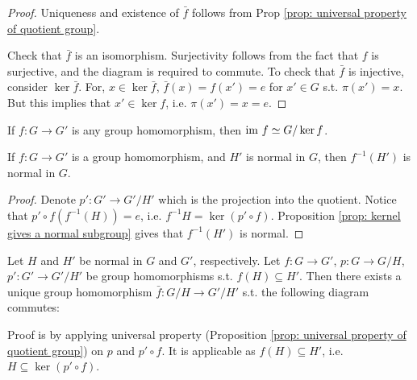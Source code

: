 \documentclass{article}
\begin{document}
\begin{proof}
    Uniqueness and existence of $\bar{f}$ follows from Prop \ref{prop: universal property of quotient group}. 

    Check that $\bar{f}$ is an isomorphism. Surjectivity follows from the fact that $f$ is surjective, and the diagram is required to commute. To check that $\bar{f}$ is injective, consider $\ker \bar{f}$. For, $x \in \ker \bar{f}$, $\bar{f}(x) = f(x') = e$ for $x' \in G$ s.t. $\pi(x') = x$. But this implies that $x' \in \ker f$, i.e. $\pi(x') = x = e$.
\end{proof}

\begin{corollary}
    If $f: G \to G'$ is any group homomorphism, then $\mathrm{im}\  f \simeq G/\ker f$.
\end{corollary}

\begin{remark}
    If $f: G \to G'$ is a group homomorphism, and $H'$ is normal in $G$, then $f^{-1}(H')$ is normal in $G$.
\end{remark}

\begin{proof}
    Denote $p': G' \to G'/H'$ which is the projection into the quotient. Notice that $p' \circ f (f^{-1}(H)) = e$, i.e. $f^{-1}H = \ker (p' \circ f)$. Proposition \ref{prop: kernel gives a normal subgroup} gives that $f^{-1}(H')$ is normal. 
\end{proof}

\begin{remark}\label{rmk: transformation between quotient on normal subgroups}
    Let $H$ and $H'$ be normal in $G$ and $G'$, respectively. Let $f: G \to G'$, $p: G \to G/H$, $p': G' \to G'/H'$ be group homomorphisms s.t. $f(H) \subseteq H'$. Then there exists a unique group homomorphism $\bar{f}: G/H \to G'/H'$ s.t. the following diagram commutes:
    
    \begin{minipage}{\linewidth}
        \centering
    \end{minipage}

    Proof is by applying universal property (Proposition \ref{prop: universal property of quotient group}) on $p$ and $p' \circ f$. It is applicable as $f(H) \subseteq H'$, i.e. $H \subseteq \ker (p' \circ f)$.
\end{remark}
\end{document}
